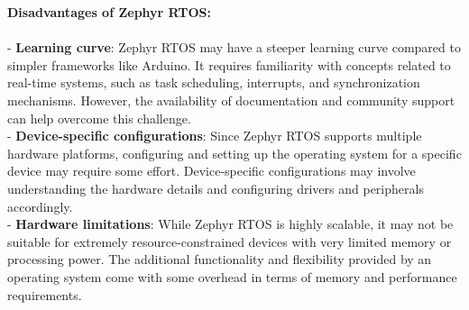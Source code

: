 \textbf{Disadvantages of Zephyr RTOS:} \\\\
- \textbf{Learning curve}: Zephyr RTOS may have a steeper learning curve compared to simpler frameworks like Arduino. It requires familiarity with concepts related to real-time systems, such as task scheduling, interrupts, and synchronization mechanisms. However, the availability of documentation and community support can help overcome this challenge. \\
- \textbf{Device-specific configurations}: Since Zephyr RTOS supports multiple hardware platforms, configuring and setting up the operating system for a specific device may require some effort. Device-specific configurations may involve understanding the hardware details and configuring drivers and peripherals accordingly. \\
- \textbf{Hardware limitations}: While Zephyr RTOS is highly scalable, it may not be suitable for extremely resource-constrained devices with very limited memory or processing power. The additional functionality and flexibility provided by an operating system come with some overhead in terms of memory and performance requirements.
\pagebreak
